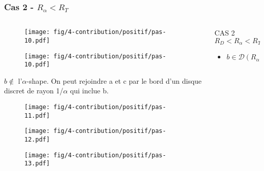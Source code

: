 \begin{frame}
  \frametitle{Cas 2 - $R_{\alpha} < R_T$}

\begin{columns}[t]
    \begin{column}{7cm}
      {
        \begin{figure}[h!]
          \centering
          \texttt{[image: fig/4-contribution/positif/pas-10.pdf]}
        \end{figure}
      }
      {
        \begin{figure}[h!]
          \centering
          \texttt{[image: fig/4-contribution/positif/pas-10.pdf]}
        \end{figure}

				\begin{block}{$b \notin$ l'$\alpha$-shape.}
          On peut rejoindre a et c par le bord d'un disque discret de rayon 1/$\alpha$ qui inclue b.
        \end{block}

      }
      {
        \begin{figure}[h!]
          \centering
          \texttt{[image: fig/4-contribution/positif/pas-11.pdf]}
        \end{figure}
      }
      {
        \begin{figure}[h!]
          \centering
          \texttt{[image: fig/4-contribution/positif/pas-12.pdf]}
        \end{figure}
      }
      {
        \begin{figure}[h!]
          \centering
          \texttt{[image: fig/4-contribution/positif/pas-13.pdf]}
        \end{figure}
			}
    \end{column}
    \begin{column}{3cm}
      \begin{block}{}
        {
          \alert{CAS 2}
          \alert{$R_D < R_{\alpha} < R_T$}\\
        }
        {
          \begin{itemize}
            \item $b \in \mathcal{D} \left( R_{\alpha} \right)$
          \end{itemize}
          
}
\end{block}
\end{column}
\end{columns}
\end{frame}

